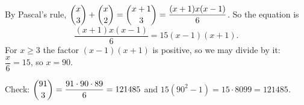 By Pascal's rule, $\dbinom x3+\dbinom x2=\dbinom{x+1}3=\dfrac{(x+1)x(x-1)}{6}$. So the equation is
\[
\dfrac{(x+1)x(x-1)}{6}=15(x-1)(x+1).
\]
For $x\ge3$ the factor $(x-1)(x+1)$ is positive, so we may divide by it: $\dfrac {x}{6}=15$, so $x=\boxed{90}$.

Check: $\dbinom{91}{3}=\dfrac{91\cdot90\cdot89}{6}=121485$ and $15\left(90^2-1\right)=15\cdot8099=121485$.

